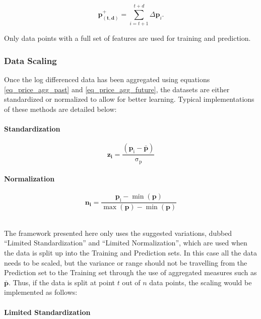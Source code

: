 \documentclass[a4paper,11pt,oneside]{article}
\theoremstyle{plain}
\theoremstyle{definition}
\begin{document}
	\begin{equation}\label{eq_price_agg_future}
	 \mathbf{p^{+}_{(t,d)}} = \sum_{i = t+1}^{t+d} \Delta\mathbf{p}_i .
	\end{equation}
	
	Only data points with a full set of features are used for training and prediction.
	
	\subsubsection{Data Scaling}\label{data_scaling}
	Once the log differenced data has been aggregated using equations \eqref{eq_price_agg_past} and \eqref{eq_price_agg_future}, the datasets are either standardized or normalized to allow for better learning. Typical implementations of these methods are detailed below:
	
	\paragraph{Standardization}
	\begin{equation}
	\mathbf{z_i}= \mathrm{\frac{(\mathbf{p}_i - \mathbf{\bar{p}}) }{\sigma_p}}
	\end{equation}
	
	\paragraph{Normalization}
	
	\begin{equation}\label{eq_ltd_normalization}
	\mathbf{n_i}= 
	\frac{\mathrm{\mathbf{p}_i - \min \left( \mathbf{p} \right)   } }
	{\mathrm{\max \left( \mathbf{p} \right) - \min \left( \mathbf{p} \right)  }}
	\end{equation}
	
	~\\
	The framework presented here only uses the suggested variations, dubbed ``Limited Standardization'' and ``Limited Normalization'', which are used when the data is split up into the Training and Prediction sets. In this case all the data needs to be scaled, but the variance or range should not be travelling from the Prediction set to the Training set through the use of aggregated measures such as $\bar{\mathbf{p}}$. Thus, if the data is split at point $t$ out of $n$ data points, the scaling would be implemented as follows:
	
	\paragraph{Limited Standardization}
	
\end{document}
